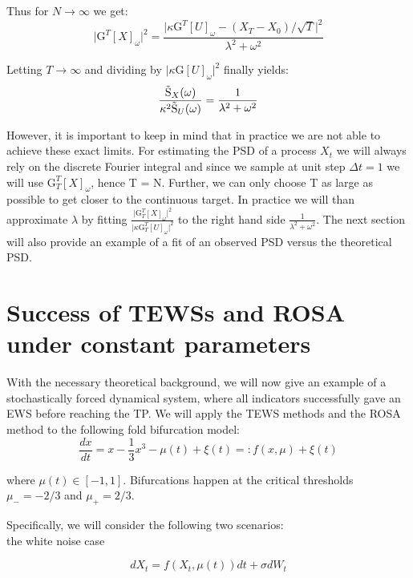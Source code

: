 \documentclass[%
thesis=student,%
coverpage=false,%
titlepage=false,%
headmarks=true, %
english,%
font=libertine, %
math=newpxtx, %
BCOR=5mm,%
coverBCOR=11mm%
]{tumbook}
\begin{document}
Thus for $N \rightarrow \infty$ we get:
\[
    \lvert \mathrm{G}^{T}[X]_{\omega} \rvert^2 = \frac{\lvert\kappa \mathrm{G}^{T}[U]_{\omega} - (X_{T}-X_{0})/\sqrt{T}\rvert ^2}{\lambda^2 + \omega^2}
\]

Letting $T \rightarrow \infty$ and dividing by $\lvert\kappa \mathrm{G}[U]_{\omega}\rvert^2$ finally yields:
\[
    \frac{\mathrm{\Tilde{S}}_{X}(\omega)}{\kappa^2\mathrm{\Tilde{S}}_{U}(\omega)} = \frac{1}{\lambda^2 + \omega^2}
\]

However, it is important to keep in mind that in practice we are not able to achieve these exact limits. For estimating the PSD of a process $X_{t}$ we will always rely on the discrete Fourier integral and since we sample at unit step $\Delta t = 1$ we will use $\mathrm{G}_{T}^{T}[X]_{\omega}$, hence T = N. Further, we can only choose T as large as possible to get closer to the continuous target. In practice we will than approximate $\lambda$ by fitting $\frac{\lvert \mathrm{G}_{T}^{T}[X]_{\omega} \rvert ^2}{\lvert \kappa \mathrm{G}_{T}^{T}[U]_{\omega} \rvert ^2}$ to the right hand side $\frac{1}{\lambda^2 + \omega^2}$. The next section will also provide an example of a fit of an observed PSD versus the theoretical PSD.





\chapter{Success of TEWSs and ROSA under constant parameters}

With the necessary theoretical background, we will now give an example of a stochastically forced dynamical system, where all indicators successfully gave an EWS before reaching the TP.
We will apply the TEWS methods and the ROSA method to the following fold bifurcation model: 
        \[
            \frac{dx}{dt} = x - \frac{1}{3}x^3 - \mu(t) + \xi(t) =: f(x,\mu) + \xi(t)
        \]
        
where $\mu(t) \in [-1,1]$. Bifurcations happen at the critical thresholds $\mu_{-} = -2/3$ and $\mu_{+} = 2/3$.

Specifically, we will consider the following two scenarios: \\
the white noise case
    
    \begin{equation}  
    dX_{t} = f(X_{t},\mu(t))dt + \sigma dW_{t}
    \label{successful application white noise}
    \end{equation}
\end{document}

